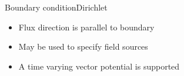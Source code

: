 %
%
%
%
%

\begin{frame}{Boundary condition}{Dirichlet}
  \begin{itemize}
  \item Flux direction is parallel to boundary
  \item May be used to specify field sources
  \item A time varying vector potential is supported
  \end{itemize}
  \vfill
  \centering
  
\end{frame}

